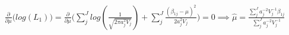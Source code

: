 \begin{multline}
\frac{\partial}{\partial \mu}\Big(log(L_1)\Big) =
\frac{\partial}{\partial \mu} \Big(\sum\limits_j^J log(\frac{1}{\sqrt{2 \pi a_j^2 V_j}}) + \sum\limits_j^J \frac{(\beta_{1j} - \mu)^2}{2 a_j^2V_j}\Big) = 0
\implies \hat{\mu} = \frac{\sum\limits_j^J a_j^{-2}V_j^{-1}\beta_{1j}}{\sum\limits_j^J a_j^{-2}V_j^{-1}}
\end{multline}